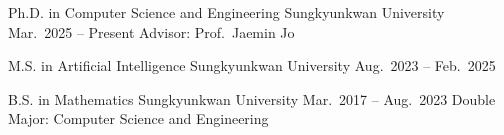\begin{cventries}
  \cventry
    {Ph.D. in Computer Science and Engineering}
    {Sungkyunkwan University}
    {Mar.\ 2025 – Present}
    {}
    {Advisor: Prof.\ Jaemin Jo}

  \cventry
    {M.S. in Artificial Intelligence}
    {Sungkyunkwan University}
    {Aug.\ 2023 – Feb.\ 2025}
    {}
    {}

  \cventry
    {B.S. in Mathematics}
    {Sungkyunkwan University}
    {Mar.\ 2017 – Aug.\ 2023}
    {}
    {Double Major: Computer Science and Engineering}
\end{cventries}
